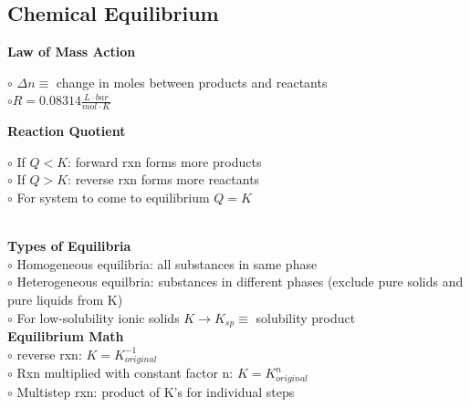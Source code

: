 \subsection{Chemical Equilibrium}
\begin{minipage}{0.55\linewidth}
\textbf{Law of Mass Action}\\
\end{minipage}
\begin{minipage}{0.3\linewidth}
    $\circ$ $\Delta n \equiv$ change in moles between products and reactants\\
    $\circ R = 0.08314 \frac{L\cdot bar}{mol \cdot K}$
\end{minipage}
\begin{minipage}{0.3\linewidth}
    \textbf{Reaction Quotient}\\
\end{minipage}
\begin{minipage}{0.6\linewidth}
    $\circ$ If $Q < K$: forward rxn forms more products\\
    $\circ$ If $Q > K$: reverse rxn forms more reactants\\
    $\circ$ For system to come to equilibrium $Q = K$
\end{minipage}
\vspace{1pt}\\
\textbf{Types of Equilibria}\\
$\circ$ Homogeneous equilibria: all substances in same phase\\
$\circ$ Heterogeneous equilbria: substances in different phases (exclude pure solids and pure liquids from K)\\
$\circ$ For low-solubility ionic solids $K \longrightarrow K_{sp} \equiv$ solubility product
\vspace{1pt}\\
\textbf{Equilibrium Math}\\
$\circ$ reverse rxn: $K = K_{original}^{-1}$\\
$\circ$ Rxn multiplied with constant factor n: $K = K_{original}^n$\\
$\circ$ Multistep rxn: product of K's for individual steps
